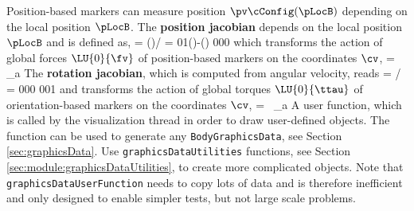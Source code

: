     Position-based markers can measure position $\pv\cConfig(\pLocB)$ depending on the local position $\pLocB$. 
    The {\bf position jacobian} depends on the local position $\pLocB$ and is defined as,
    \be
       = \partial {}\cConfig(\pLocB)\cCur / \partial \cv\cCur =  
                                                             {0}{1}{\cos(\theta)-\sin(\theta)} {0}{0}{0}
    \ee
    which transforms the action of global forces $\LU{0}{\fv}$ of position-based markers on the coordinates $\cv$,
    \be
      \Qm =  _a
    \ee
    The {\bf rotation jacobian}, which is computed from angular velocity, reads
    \be
       = \partial {}\cCur / \partial \dot \cv\cCur =  {0}{0}{0} {0}{0}{1}
    \ee
    and transforms the action of global torques $\LU{0}{\ttau}$ of orientation-based markers on the coordinates $\cv$,
    \be
      \Qm =  \, _a
    \ee
    A user function, which is called by the visualization thread in order to draw user-defined objects.
    The function can be used to generate any \texttt{BodyGraphicsData}, see Section \ref{sec:graphicsData}.
    Use \texttt{graphicsDataUtilities} functions, see Section \ref{sec:module:graphicsDataUtilities}, to create more complicated objects. 
    Note that \texttt{graphicsDataUserFunction} needs to copy lots of data and is therefore
    inefficient and only designed to enable simpler tests, but not large scale problems.

